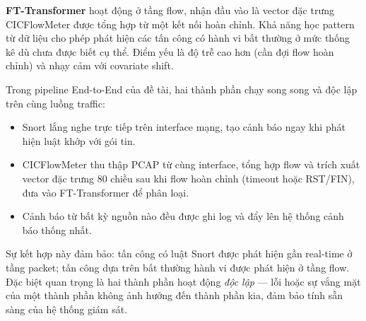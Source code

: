 \documentclass[../DoAn.tex]{subfiles}
\begin{document}
\textbf{FT-Transformer} hoạt động ở tầng flow, nhận đầu vào là vector đặc trưng CICFlowMeter được tổng hợp từ một kết nối hoàn chỉnh. Khả năng học pattern từ dữ liệu cho phép phát hiện các tấn công có hành vi bất thường ở mức thống kê dù chưa được biết cụ thể. Điểm yếu là độ trễ cao hơn (cần đợi flow hoàn chỉnh) và nhạy cảm với covariate shift.

Trong pipeline End-to-End của đề tài, hai thành phần chạy song song và độc lập trên cùng luồng traffic:

\begin{itemize}
    \item Snort lắng nghe trực tiếp trên interface mạng, tạo cảnh báo ngay khi phát hiện luật khớp với gói tin.
    \item CICFlowMeter thu thập PCAP từ cùng interface, tổng hợp flow và trích xuất vector đặc trưng 80 chiều sau khi flow hoàn chỉnh (timeout hoặc RST/FIN), đưa vào FT-Transformer để phân loại.
    \item Cảnh báo từ bất kỳ nguồn nào đều được ghi log và đẩy lên hệ thống cảnh báo thống nhất.
\end{itemize}

Sự kết hợp này đảm bảo: tấn công có luật Snort được phát hiện gần real-time ở tầng packet; tấn công dựa trên bất thường hành vi được phát hiện ở tầng flow. Đặc biệt quan trọng là hai thành phần hoạt động \textit{độc lập} --- lỗi hoặc sự vắng mặt của một thành phần không ảnh hưởng đến thành phần kia, đảm bảo tính sẵn sàng của hệ thống giám sát.
\end{document}
